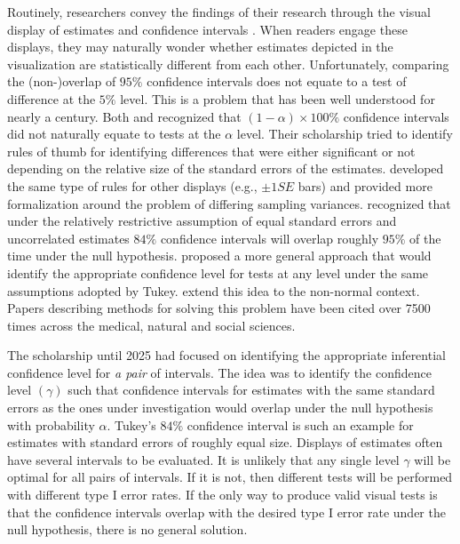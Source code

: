 Routinely, researchers convey the findings of their research through the visual display of estimates and confidence intervals \citep{few12b, kastellec07}. When readers engage these displays, they may naturally wonder whether estimates depicted in the visualization are statistically different from each other. Unfortunately, comparing the (non-)overlap of \(95\%\) confidence intervals does not equate to a test of difference at the \(5\%\) level. This is a problem that has been well understood for nearly a century. Both \citet{dice_1936} and \citet{simpson1939} recognized that \((1-\alpha)\times 100\%\) confidence intervals did not naturally equate to tests at the \(\alpha\) level. Their scholarship tried to identify rules of thumb for identifying differences that were either significant or not depending on the relative size of the standard errors of the estimates. \citet{browne79} developed the same type of rules for other displays (e.g., \(\pm 1SE\) bars) and provided more formalization around the problem of differing sampling variances. \citet{tukey1991} recognized that under the relatively restrictive assumption of equal standard errors and uncorrelated estimates \(84\%\) confidence intervals will overlap roughly \(95\%\) of the time under the null hypothesis. \citet{godlstein_healey_95} proposed a more general approach that would identify the appropriate confidence level for tests at any level under the same assumptions adopted by Tukey. \citet{payton_2003} extend this idea to the non-normal context. Papers describing methods for solving this problem have been cited over 7500 times across the medical, natural and social sciences.

The scholarship until 2025 had focused on identifying the appropriate inferential confidence level for \emph{a pair} of intervals. The idea was to identify the confidence level \((\gamma)\) such that confidence intervals for estimates with the same standard errors as the ones under investigation would overlap under the null hypothesis with probability \(\alpha\). Tukey's \(84\%\) confidence interval is such an example for estimates with standard errors of roughly equal size. Displays of estimates often have several intervals to be evaluated. It is unlikely that any single level \(\gamma\) will be optimal for all pairs of intervals. If it is not, then different tests will be performed with different type I error rates. If the only way to produce valid visual tests is that the confidence intervals overlap with the desired type I error rate under the null hypothesis, there is no general solution.

